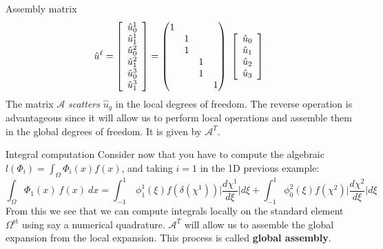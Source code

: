 \begin{frame}{Assembly matrix}
  \begin{equation}
    \label{eq:52}
    \hat{u}^\ell = \left[
      \begin{array}[c]{c}
        \hat{u}^1_0\\
        \hat{u}^1_1\\
        \hat{u}^2_0\\
        \hat{u}^2_1\\
        \hat{u}^3_0\\
        \hat{u}^3_1\\
      \end{array} \right]
    =
    \begin{pmatrix}
      1 & & &\\
      & 1 & &\\
      & 1 & &\\
      &  & 1 &\\
      &  & 1 &\\
      &  &  & 1 \\
    \end{pmatrix}
    \
    \left[\begin{array}[c]{c}
        \hat{u}_0\\
        \hat{u}_1\\
        \hat{u}_2\\
        \hat{u}_3\\
      \end{array} \right]
  \end{equation}
  The matrix $\mathcal{A}$ \emph{scatters} $\hat{u}_g$ in the local
  degrees of freedom. The reverse operation is advantageous since it
  will allow us to perform local operations and assemble them in the
  global degrees of freedom. It is given by $\mathcal{A}^T$.
\end{frame}

\begin{frame}{Integral computation}
  Consider now that you have to compute the algebraic $l(\Phi_i) =
  \int_\Omega  \Phi_i(x) f(x)$, and taking $i=1$ in the 1D previous example:
  \begin{equation}
    \label{eq:53}
    \int_\Omega \Phi_1(x)\ f(x)\ dx  = \int_{-1}^1\ \phi^1_1(\xi) f(\delta(\chi^1)) \Big|\frac{d \chi^1}{d \xi}\Big| d\xi + \int_{-1}^1 \phi^2_0(\xi) f(\chi^2) \Big|\frac{d \chi^2}{d \xi}\Big| d\xi
  \end{equation}
  From this we see that we can compute integrals locally on the
  standard element $\Omega^{\text{st}}$ using say a numerical
  quadrature. $\mathcal{A}^T$ will allow us to assemble the global
  expansion from the local expansion. This process is called
  \textbf{global assembly}.
\end{frame}

